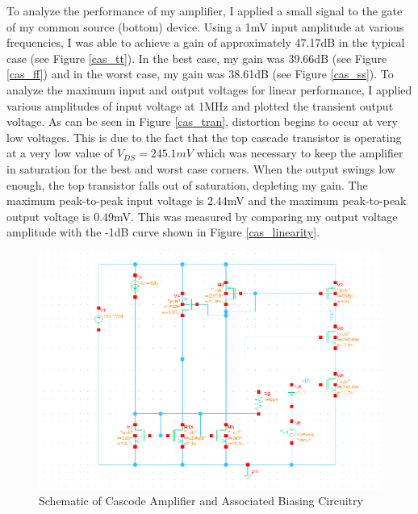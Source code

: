\documentclass{article}
\begin{document}
To analyze the performance of my  amplifier, I applied a small signal to the gate of my common source (bottom) device. Using a 1mV input amplitude at various frequencies, I was able to achieve a gain of approximately 47.17dB in the typical case (see Figure \ref{cas_tt}). In the best case, my gain was 39.66dB (see Figure \ref{cas_ff}) and in the worst case, my gain was 38.61dB (see Figure \ref{cas_ss}). To analyze the maximum input and output voltages for linear performance, I applied various amplitudes of input voltage at 1MHz and plotted the transient output voltage. As can be seen in Figure \ref{cas_tran}, distortion begins to occur at very low voltages. This is due to the fact that the top cascade transistor is operating at a very low value of $V_{DS} = 245.1mV$ which was necessary to keep the amplifier in saturation for the best and worst case corners. When the output swings low enough, the top transistor falls out of saturation, depleting my gain. The maximum peak-to-peak input voltage is 2.44mV and the maximum peak-to-peak output voltage is 0.49mV. This was measured by comparing my output voltage amplitude with the -1dB curve shown in Figure \ref{cas_linearity}.

\begin{figure}[H]
\centering
\includegraphics[width=6in]{2_cas_schematic.png}
\caption{Schematic of Cascode Amplifier and Associated Biasing Circuitry}
\label{cas_schem}
\end{figure}
\end{document}
